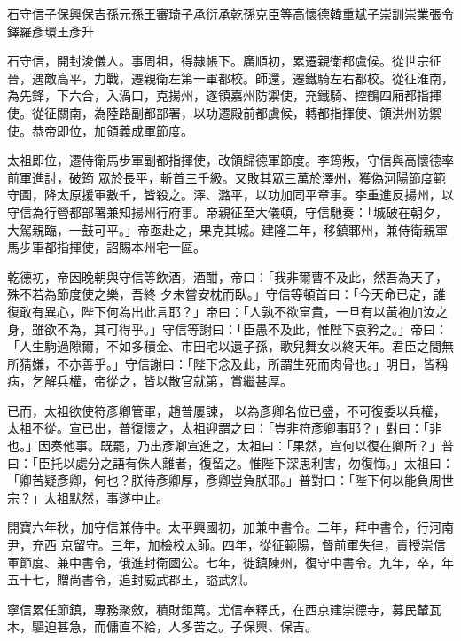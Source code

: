 
\begin{pinyinscope}

 石守信子保興保吉孫元孫王審琦子承衍承乾孫克臣等高懷德韓重斌子崇訓崇業張令鐸羅彥環王彥升



 石守信，開封浚儀人。事周祖，得隸帳下。廣順初，累遷親衛都虞候。從世宗征晉，遇敵高平，力戰，遷親衛左第一軍都校。師還，遷鐵騎左右都校。從征淮南，為先鋒，下六合，入渦口，克揚州，遂領嘉州防禦使，充鐵騎、控鶴四廂都指揮使。從征關南，為陸路副都部署，以功遷殿前都虞候，轉都指揮使、領洪州防禦使。恭帝即位，加領義成軍節度。



 太祖即位，遷侍衛馬步軍副都指揮使，改領歸德軍節度。李筠叛，守信與高懷德率前軍進討，破筠
 眾於長平，斬首三千級。又敗其眾三萬於澤州，獲偽河陽節度範守圖，降太原援軍數千，皆殺之。澤、潞平，以功加同平章事。李重進反揚州，以守信為行營都部署兼知揚州行府事。帝親征至大儀頓，守信馳奏：「城破在朝夕，大駕親臨，一鼓可平。」帝亟赴之，果克其城。建隆二年，移鎮鄆州，兼侍衛親軍馬步軍都指揮使，詔賜本州宅一區。



 乾德初，帝因晚朝與守信等飲酒，酒酣，帝曰：「我非爾曹不及此，然吾為天子，殊不若為節度使之樂，吾終
 夕未嘗安枕而臥。」守信等頓首曰：「今天命已定，誰復敢有異心，陛下何為出此言耶？」帝曰：「人孰不欲富貴，一旦有以黃袍加汝之身，雖欲不為，其可得乎。」守信等謝曰：「臣愚不及此，惟陛下哀矜之。」帝曰：「人生駒過隙爾，不如多積金、市田宅以遺子孫，歌兒舞女以終天年。君臣之間無所猜嫌，不亦善乎。」守信謝曰：「陛下念及此，所謂生死而肉骨也。」明日，皆稱病，乞解兵權，帝從之，皆以散官就第，賞繼甚厚。



 已而，太祖欲使符彥卿管軍，趙普屢諫，
 以為彥卿名位已盛，不可復委以兵權，太祖不從。宣已出，普復懷之，太祖迎謂之曰：「豈非符彥卿事耶？」對曰：「非也。」因奏他事。既罷，乃出彥卿宣進之，太祖曰：「果然，宣何以復在卿所？」普曰：「臣托以處分之語有侏人離者，復留之。惟陛下深思利害，勿復悔。」太祖曰：「卿苦疑彥卿，何也？朕待彥卿厚，彥卿豈負朕耶。」普對曰：「陛下何以能負周世宗？」太祖默然，事遂中止。



 開寶六年秋，加守信兼侍中。太平興國初，加兼中書令。二年，拜中書令，行河南尹，充西
 京留守。三年，加檢校太師。四年，從征範陽，督前軍失律，責授崇信軍節度、兼中書令，俄進封衛國公。七年，徙鎮陳州，復守中書令。九年，卒，年五十七，贈尚書令，追封威武郡王，謚武烈。



 寧信累任節鎮，專務聚斂，積財鉅萬。尤信奉釋氏，在西京建崇德寺，募民輦瓦木，驅迫甚急，而傭直不給，人多苦之。子保興、保吉。




\end{pinyinscope}
